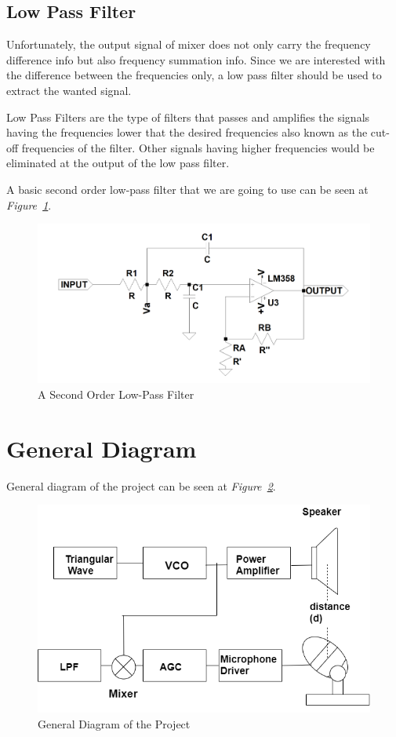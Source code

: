 \documentclass[paper]{IEEEtran}
\begin{document}
\vfill
		
\subsection{Low Pass Filter}
\- \indent
	Unfortunately, the output signal of mixer does not only carry the frequency difference info but also frequency summation info. Since we are interested with the difference between the frequencies only, a low pass filter should be used to extract the wanted signal.
	
	Low Pass Filters are the type of filters that passes and amplifies the signals having the frequencies lower that the desired frequencies also known as the cut-off frequencies of the filter. Other signals having higher frequencies would be eliminated at the output of the low pass filter. 	

	A basic second order low-pass filter that we are going to use can be seen at \textit{Figure~\ref{fig:lpf}}.
 
\begin{figure}[h!]
\setlength{\unitlength}{\textwidth}
\center 
\includegraphics[width=0.5\unitlength]{solpf.png}
\caption{\label{fig:lpf} A Second Order Low-Pass Filter }
\end{figure}	

		
\section{General Diagram}
\- \indent
	General diagram of the project can be seen at \textit{Figure~\ref{fig:diagram}}.

\begin{figure}[h!]
\setlength{\unitlength}{\textwidth}
\center 
\includegraphics[width=0.5\unitlength]{diagram3.png}
\caption{\label{fig:diagram} General Diagram of the Project }
\end{figure}	
\end{document}

